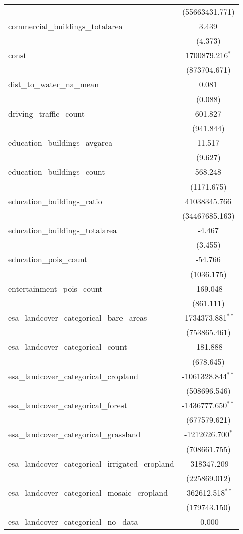 \begin{table}[!htbp]
\begin{tabular}{@{\extracolsep{5pt}}lc}
  & (55663431.771) \\
 commercial_buildings_totalarea & 3.439$^{}$ \\
  & (4.373) \\
 const & 1700879.216$^{*}$ \\
  & (873704.671) \\
 dist_to_water_na_mean & 0.081$^{}$ \\
  & (0.088) \\
 driving_traffic_count & 601.827$^{}$ \\
  & (941.844) \\
 education_buildings_avgarea & 11.517$^{}$ \\
  & (9.627) \\
 education_buildings_count & 568.248$^{}$ \\
  & (1171.675) \\
 education_buildings_ratio & 41038345.766$^{}$ \\
  & (34467685.163) \\
 education_buildings_totalarea & -4.467$^{}$ \\
  & (3.455) \\
 education_pois_count & -54.766$^{}$ \\
  & (1036.175) \\
 entertainment_pois_count & -169.048$^{}$ \\
  & (861.111) \\
 esa_landcover_categorical_bare_areas & -1734373.881$^{**}$ \\
  & (753865.461) \\
 esa_landcover_categorical_count & -181.888$^{}$ \\
  & (678.645) \\
 esa_landcover_categorical_cropland & -1061328.844$^{**}$ \\
  & (508696.546) \\
 esa_landcover_categorical_forest & -1436777.650$^{**}$ \\
  & (677579.621) \\
 esa_landcover_categorical_grassland & -1212626.700$^{*}$ \\
  & (708661.755) \\
 esa_landcover_categorical_irrigated_cropland & -318347.209$^{}$ \\
  & (225869.012) \\
 esa_landcover_categorical_mosaic_cropland & -362612.518$^{**}$ \\
  & (179743.150) \\
 esa_landcover_categorical_no_data & -0.000$^{}$ \\

\end{tabular}
\end{table}
